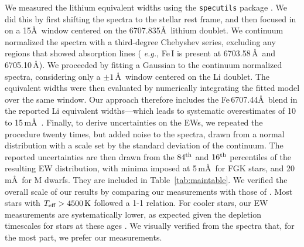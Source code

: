 \documentclass[12pt,twocolumn,tighten]{aastex63}
\begin{document}
We measured the lithium equivalent widths using the \texttt{specutils}
package \citep{specutils_v1pt1}.  We did this by first shifting the
spectra to the stellar rest frame, and then focused in on a 15\AA\
window centered on the 6707.835\AA\ lithium doublet.  We 
continuum normalized the spectra with a third-degree Chebyshev
series, excluding any regions that showed absorption lines ({\it
e.g.}, Fe\,\textsc{I} is present at 6703.58\,\AA\ and 6705.10\,\AA).
We proceeded by fitting a Gaussian to the continuum normalized
spectra, considering only a $\pm 1\,$\AA\ window centered on the Li
doublet.  The equivalent widths were then evaluated by numerically
integrating the fitted model over the same window.  Our approach
therefore includes the Fe\,6707.44\AA\ blend in the reported Li equivalent
widths---which leads to systematic overestimates of 10 to
15\,m\AA\ \citep[{\it e.g.},][]{bouvier_pleiades_lirot_2018}.
Finally, to derive uncertainties on the EWs, we repeated the procedure
twenty times, but added noise to the spectra, drawn from a normal
distribution with a scale set by the standard deviation of the
continuum.  The reported uncertainties are then drawn from the
$84^{\rm th}$ and $16^{\rm th}$ percentiles of the resulting EW
distribution, with minima imposed at 5\,m\AA\ for FGK stars, and
20\,m\AA\ for M dwarfs. They are included in
Table~\ref{tab:maintable}.  We verified the overall scale of our
results by comparing our measurements with those of
\citet{randich_gaiaeso_2018}.  Most stars with $T_{\rm eff} >
4500\,{\rm K}$ followed a 1-1 relation.  For cooler stars, our EW
measurements are systematically lower, as expected given the depletion
timescales for stars at these ages \citep[{\it
e.g.},][]{soderblom_ages_2014}.  We visually verified from the spectra
that, for the most part, we prefer our measurements.


\end{document}

